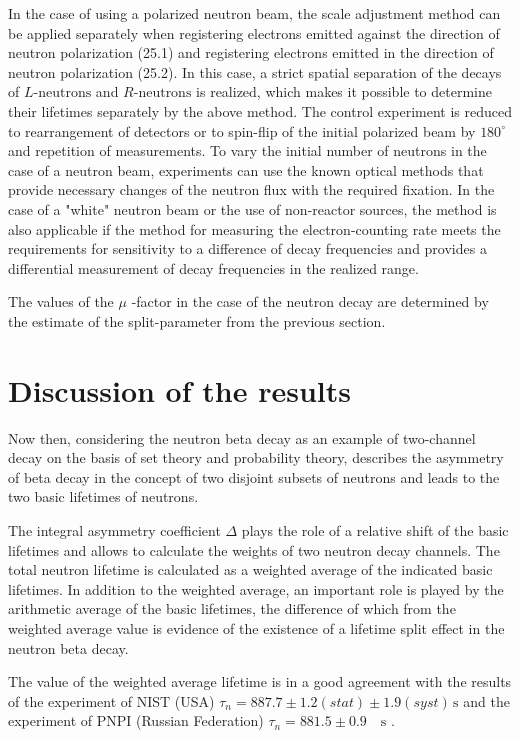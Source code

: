 \documentclass[article]{elsarticle}
\begin{document}
In the case of using a polarized neutron beam, the scale adjustment method can be applied separately when registering electrons emitted against the direction of neutron polarization (25.1) and registering electrons emitted in the direction of neutron polarization (25.2). In this case, a strict spatial separation of the decays of $L\mbox{-neutrons}$ and $R\mbox{-neutrons}$ is realized, which makes it possible to determine their lifetimes separately by the above method. The control experiment is reduced to rearrangement of detectors or to spin-flip of the initial polarized beam by $180^{\circ}$ and repetition of measurements. To vary the initial number of neutrons in the case of a neutron beam, experiments can use the known optical methods that provide necessary changes of the neutron flux with the required fixation. In the case of a "white" neutron beam or the use of non-reactor sources, the method is also applicable if the method for measuring the electron-counting rate meets the requirements for sensitivity to a difference of decay frequencies and provides a differential measurement of decay frequencies in the realized range.

The values of the $ \mu $ -factor in the case of the neutron decay are determined by the estimate of the split-parameter from the previous section.


\section{Discussion of the results} 
\label{sect4:DISRT}
Now then, considering the neutron beta decay as an example of two-channel decay on the basis of set theory and probability theory, describes the asymmetry of beta decay in the concept of two disjoint subsets of neutrons and leads to the two basic lifetimes of neutrons.

The integral asymmetry coefficient  $\Delta$ plays the role of a relative shift of the basic lifetimes and allows to calculate the weights of two neutron decay channels. The total neutron lifetime is calculated as a weighted average of the indicated basic lifetimes. In addition to the weighted average, an important role is played by the arithmetic average of the basic lifetimes, the difference of which from the weighted average value is evidence of the existence of a lifetime split effect in the neutron beta decay. 

The value of the weighted average lifetime is in a good agreement with the results of the experiment of NIST (USA) $\tau_n=887.7\pm 1.2 (stat)\pm 1.9 (syst) \, \mbox{s} $ \cite{Yue2013}  and the experiment of PNPI (Russian Federation) $\tau_n=881.5 \pm 0.9 \quad \mbox{s}$ \cite{Sereb2018}. 
\end{document}
